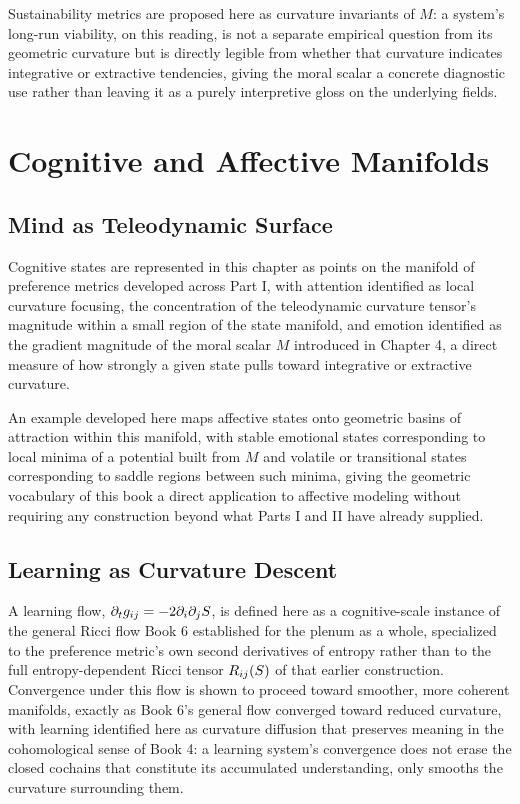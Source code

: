 Sustainability metrics are proposed here as curvature invariants of $M$: a system's long-run viability, on this reading, is not a separate empirical question from its geometric curvature but is directly legible from whether that curvature indicates integrative or extractive tendencies, giving the moral scalar a concrete diagnostic use rather than leaving it as a purely interpretive gloss on the underlying fields.

\part{Cognitive and Affective Manifolds}

\chapter{Mind as Teleodynamic Surface}

Cognitive states are represented in this chapter as points on the manifold of preference metrics developed across Part I, with attention identified as local curvature focusing, the concentration of the teleodynamic curvature tensor's magnitude within a small region of the state manifold, and emotion identified as the gradient magnitude of the moral scalar $M$ introduced in Chapter 4, a direct measure of how strongly a given state pulls toward integrative or extractive curvature.

An example developed here maps affective states onto geometric basins of attraction within this manifold, with stable emotional states corresponding to local minima of a potential built from $M$ and volatile or transitional states corresponding to saddle regions between such minima, giving the geometric vocabulary of this book a direct application to affective modeling without requiring any construction beyond what Parts I and II have already supplied.

\chapter{Learning as Curvature Descent}

A learning flow, $\partial_t g_{ij} = -2 \partial_i \partial_j S$, is defined here as a cognitive-scale instance of the general Ricci flow Book 6 established for the plenum as a whole, specialized to the preference metric's own second derivatives of entropy rather than to the full entropy-dependent Ricci tensor $R_{ij}(S)$ of that earlier construction. Convergence under this flow is shown to proceed toward smoother, more coherent manifolds, exactly as Book 6's general flow converged toward reduced curvature, with learning identified here as curvature diffusion that preserves meaning in the cohomological sense of Book 4: a learning system's convergence does not erase the closed cochains that constitute its accumulated understanding, only smooths the curvature surrounding them.


